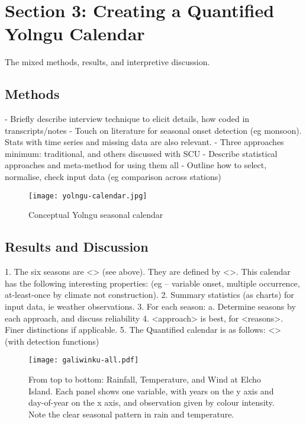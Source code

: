 \chapter{Section 3:  Creating a Quantified Yolngu Calendar}
The mixed methods, results, and interpretive discussion.

\section{Methods}
-	Briefly describe interview technique to elicit details, how coded in transcripts/notes
-	Touch on literature for seasonal onset detection (eg monsoon).  Stats with time series and missing data are also relevant.
-	Three approaches minimum:  traditional, and others discussed with SCU
-	Describe statistical approaches and meta-method for using them all
-	Outline how to select, normalise, check input data (eg comparison across stations)

\begin{figure}[h]
    \centering
    \texttt{[image: yolngu-calendar.jpg]}
    \caption{Conceptual Yolngu seasonal calendar \citep{davis1989}}
    \label{fig:yolngu-seasons}
\end{figure}

\section{Results and Discussion}
1.	The six seasons are <> (see above).  They are defined by <>.  This calendar has the following interesting properties:  (eg – variable onset, multiple occurrence, at-least-once by climate not construction).
2.	Summary statistics (as charts) for input data, ie weather observations.
3.	For each season:
a.	Determine seasons by each approach, and discuss reliability
4.	<approach> is best, for <reasons>.  Finer distinctions if applicable.
5.	The Quantified calendar is as follows:  <> (with detection functions)

\begin{figure}[h]
    \centering
    \texttt{[image: galiwinku-all.pdf]}
    \caption[Rainfall, Temperature, and Wind at Elcho Island]{From top to bottom: Rainfall, Temperature, and Wind at Elcho Island.  Each panel shows one variable, with years on the y axis and day-of-year on the x axis, and observation given by colour intensity.  Note the clear seasonal pattern in rain and temperature.}
    \label{fig:observation-panels}
\end{figure}

\begin{landscape}
\begin{table}

\end{table}
\end{landscape}

